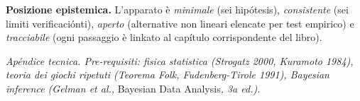 \Hypoth{} \textbf{Posizione epistemica.} L'apparato è \emph{minimale}
(sei hipótesis), \emph{consistente} (sei limiti verificaciónti), \emph{aperto}
(alternative non lineari elencate per test empirico) e
\emph{tracciabile} (ogni passaggio è linkato al capítulo corrispondente
del libro).



\emph{Apéndice tecnica. Pre-requisiti: fisica statistica (Strogatz
2000, Kuramoto 1984), teoria dei giochi ripetuti (Teorema Folk,
Fudenberg-Tirole 1991), Bayesian inference (Gelman et al., }Bayesian
Data Analysis\emph{, 3a ed.).}
